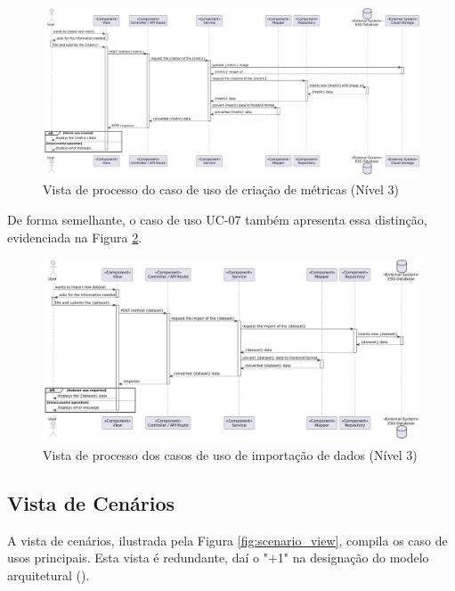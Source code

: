 \begin{figure}[H]
\centering
\includegraphics[width=\linewidth]{frontmatter/assets/diagrams/Process Views/LVL3/uc-06-lvl3.png}
\caption{Vista de processo do caso de uso de criação de métricas (Nível 3)}
\label{fig:UC6-lvl3}
\end{figure}

De forma semelhante, o caso de uso UC-07 também apresenta essa distinção, evidenciada na Figura \ref{fig:UC7-lvl3}.

\begin{figure}[H]
\centering
\includegraphics[width=\linewidth]{frontmatter/assets/diagrams/Process Views/LVL3/uc-07-lvl3.png}
\caption{Vista de processo dos casos de uso de importação de dados (Nível 3)}
\label{fig:UC7-lvl3}
\end{figure}


\subsection{Vista de Cenários}

A vista de cenários, ilustrada pela Figura \ref{fig:scenario_view}, compila os caso de usos principais. Esta vista é redundante, daí o "+1" na designação do modelo arquitetural (\cite{Kruchten1995}).


